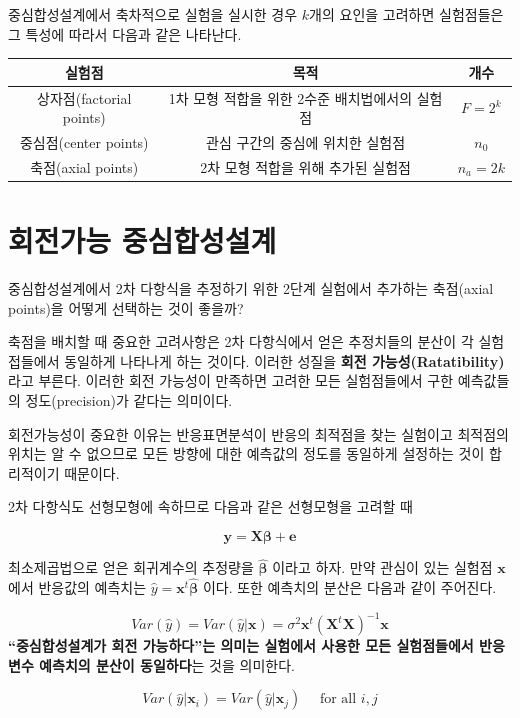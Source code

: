 \documentclass[
]{book}
\newcommand{\bm}[1]{\boldsymbol{\mathbf{#1}}}
\theoremstyle{definition}
\theoremstyle{definition}
\theoremstyle{definition}
\theoremstyle{definition}
\theoremstyle{remark}
\begin{document}
중심합성설계에서 축차적으로 실험을 실시한 경우 \(k\)개의 요인을 고려하면 실험점들은 그 특성에 따라서 다음과 같은 나타난다.

\begin{longtable}[]{@{}ccc@{}}
\toprule
실험점 & 목적 & 개수\tabularnewline
\midrule
\endhead
상자점(factorial points) & 1차 모형 적합을 위한 2수준 배치법에서의 실험점 & \(F=2^k\)\tabularnewline
중심점(center points) & 관심 구간의 중심에 위치한 실험점 & \(n_0\)\tabularnewline
축점(axial points) & 2차 모형 적합을 위해 추가된 실험점 & \(n_a=2k\)\tabularnewline
\bottomrule
\end{longtable}

\hypertarget{uxd68cuxc804uxac00uxb2a5-uxc911uxc2ecuxd569uxc131uxc124uxacc4}{%
\section{회전가능 중심합성설계}\label{uxd68cuxc804uxac00uxb2a5-uxc911uxc2ecuxd569uxc131uxc124uxacc4}}

중심합성설계에서 2차 다항식을 추정하기 위한 2단계 실험에서 추가하는 축점(axial points)을 어떻게
선택하는 것이 좋을까?

축점을 배치할 때 중요한 고려사항은 2차 다항식에서 얻은 추정치들의 분산이 각 실험접들에서 동일하게 나타나게 하는 것이다. 이러한 성질을 \textbf{회전 가능성(Ratatibility)} 라고 부른다. 이러한 회전 가능성이 만족하면 고려한 모든 실험점들에서 구한 예측값들의 정도(precision)가 같다는 의미이다.

회전가능성이 중요한 이유는 반응표면분석이 반응의 최적점을 찾는 실험이고 최적점의 위치는
알 수 없으므로 모든 방향에 대한 예측값의 정도를 동일하게 설정하는 것이 합리적이기 때문이다.

2차 다항식도 선형모형에 속하므로 다음과 같은 선형모형을 고려할 때

\[\bm y = \bm X \bm \beta + \bm e\]

최소제곱법으로 얻은 회귀계수의 추정량을 \(\hat {\bm \beta}\) 이라고 하자. 만약 관심이 있는 실험점 \(\bm x\) 에서 반응값의 예측치는 \(\hat y = {\bm x}^t \hat {\bm \beta}\) 이다. 또한
예측치의 분산은 다음과 같이 주어진다.

\[Var (\hat y) = Var (\hat y|\bm x) = \sigma^2 {\bm x}^t (\bm X^t \bm X)^{-1} {\bm x}\]
\textbf{``중심합성설계가 회전 가능하다''는 의미는 실험에서 사용한 모든 실험점들에서 반응변수 예측치의 분산이 동일하다}는 것을 의미한다.

\begin{equation}
 Var (\hat y|\bm x_i) =   Var (\hat y|\bm x_j)  \quad \text{ for all } i,j
\label{eq:ratate}
\end{equation}
\end{document}
